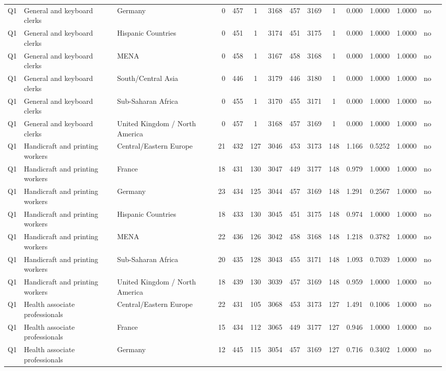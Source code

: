 \begin{longtable}{lllrcccccccccll}
Q1 & General and keyboard clerks & Germany & 0 & 457 & 1 & 3168 & 457 & 3169 & 1 & 0.000 & 1.0000 & 1.0000 & no \\
Q1 & General and keyboard clerks & Hispanic Countries & 0 & 451 & 1 & 3174 & 451 & 3175 & 1 & 0.000 & 1.0000 & 1.0000 & no \\
Q1 & General and keyboard clerks & MENA & 0 & 458 & 1 & 3167 & 458 & 3168 & 1 & 0.000 & 1.0000 & 1.0000 & no \\
Q1 & General and keyboard clerks & South/Central Asia & 0 & 446 & 1 & 3179 & 446 & 3180 & 1 & 0.000 & 1.0000 & 1.0000 & no \\
Q1 & General and keyboard clerks & Sub-Saharan Africa & 0 & 455 & 1 & 3170 & 455 & 3171 & 1 & 0.000 & 1.0000 & 1.0000 & no \\
Q1 & General and keyboard clerks & United Kingdom / North America & 0 & 457 & 1 & 3168 & 457 & 3169 & 1 & 0.000 & 1.0000 & 1.0000 & no \\
Q1 & Handicraft and printing workers & Central/Eastern Europe & 21 & 432 & 127 & 3046 & 453 & 3173 & 148 & 1.166 & 0.5252 & 1.0000 & no \\
Q1 & Handicraft and printing workers & France & 18 & 431 & 130 & 3047 & 449 & 3177 & 148 & 0.979 & 1.0000 & 1.0000 & no \\
Q1 & Handicraft and printing workers & Germany & 23 & 434 & 125 & 3044 & 457 & 3169 & 148 & 1.291 & 0.2567 & 1.0000 & no \\
Q1 & Handicraft and printing workers & Hispanic Countries & 18 & 433 & 130 & 3045 & 451 & 3175 & 148 & 0.974 & 1.0000 & 1.0000 & no \\
Q1 & Handicraft and printing workers & MENA & 22 & 436 & 126 & 3042 & 458 & 3168 & 148 & 1.218 & 0.3782 & 1.0000 & no \\
Q1 & Handicraft and printing workers & Sub-Saharan Africa & 20 & 435 & 128 & 3043 & 455 & 3171 & 148 & 1.093 & 0.7039 & 1.0000 & no \\
Q1 & Handicraft and printing workers & United Kingdom / North America & 18 & 439 & 130 & 3039 & 457 & 3169 & 148 & 0.959 & 1.0000 & 1.0000 & no \\
Q1 & Health associate professionals & Central/Eastern Europe & 22 & 431 & 105 & 3068 & 453 & 3173 & 127 & 1.491 & 0.1006 & 1.0000 & no \\
Q1 & Health associate professionals & France & 15 & 434 & 112 & 3065 & 449 & 3177 & 127 & 0.946 & 1.0000 & 1.0000 & no \\
Q1 & Health associate professionals & Germany & 12 & 445 & 115 & 3054 & 457 & 3169 & 127 & 0.716 & 0.3402 & 1.0000 & no \\

\end{longtable}
